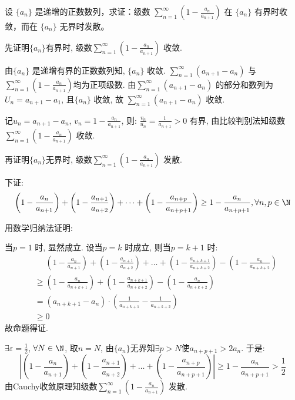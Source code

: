 \setcounter{problems}{4}
\begin{problem}
    设 \(\{a_n\}\) 是递增的正数数列，求证：级数 \(\sum_{n=1}^{\infty} \left(1 -
    \frac{a_n}{a_{n+1}}\right)\) 在 \(\{a_n\}\) 有界时收敛，而在
    \(\{a_n\}\) 无界时发散。
\end{problem}

\begin{solution}
    先证明\(\{a_{n}\}\)有界时,  级数\(\sum_{n=1}^{\infty} \left(1 -
    \frac{a_n}{a_{n+1}}\right)\) 收敛.

    由\(\{a_{n}\}\) 是递增有界的正数数列知, \(\{a_{n}\}\) 收敛.
    \(\sum_{n=1}^{\infty} (a_{n+1} - a_{n})\)
    与\(\sum_{n=1}^{\infty} \left(1 -
    \frac{a_n}{a_{n+1}}\right)\)均为正项级数. 由\(\sum_{n=1}^{\infty}
    (a_{n+1} - a_{n})\) 的部分和数列为\(U_{n} = a_{n+1} - a_{1}\),
    且\(\{a_{n}\}\) 收敛, 故 \(\sum_{n=1}^{\infty} (a_{n+1} - a_{n})\) 收敛.

    记\(u_{n} = a_{n+1} - a_{n}\), \(v_{n} = 1 -
    \frac{a_{n}}{a_{n+1}}\), 则: \(\frac{v_{n}}{u_{n}} =
    \frac{1}{a_{n+1}} > 0\) 有界,
    由比较判别法知级数\(\sum_{n=1}^{\infty} \left(1 -
    \frac{a_n}{a_{n+1}}\right)\) 收敛.

    再证明\(\{a_{n}\}\)无界时, 级数\(\sum_{n=1}^{\infty} \left(1 -
    \frac{a_n}{a_{n+1}}\right)\) 发散.

    下证: \[
        \left(1 - \frac{a_{n}}{a_{n+1}}\right) + \left(1 -
        \frac{a_{n+1}}{a_{n+2}}\right) + \dots +
        \left(1 - \frac{a_{n+p}}{a_{n+p+1}}\right) \geq 1 -
        \frac{a_{n}}{a_{n+p+1}}, \forall n, p \in \N
    \]

    用数学归纳法证明:

    当\(p = 1\) 时, 显然成立.
    设当\(p = k\) 时成立, 则当\(p = k+1\) 时:
    \begin{align*}
        &\mathrel{\phantom{=}} \left(1 - \frac{a_{n}}{a_{n+1}}\right)
        + \left(1 - \frac{a_{n+1}}{a_{n+2}}\right) + \dots + \left(1 -
        \frac{a_{n+k+1}}{a_{n+k+2}}\right) - \left(1 -
        \frac{a_{n}}{a_{n+k+2}}\right)\\
        & \geq \left(1 - \frac{a_{n}}{a_{n+k+1}}\right) + \left(1 -
        \frac{a_{n+k+1}}{a_{n+k+2}}\right) - \left(1 -
        \frac{a_{n}}{a_{n+k+2}}\right)\\
        &= \left(a_{n+k+1} - a_{n}\right) \cdot \left(
            \frac{1}{a_{n+k+1}} -
        \frac{1}{a_{n+k+2}} \right)\\
        & \geq 0
    \end{align*}
    故命题得证.

    \(\exists \varepsilon = \frac{1}{2}\), \(\forall N \in
    \N\), 取\(n = N\), 由\(\{a_{n}\}\)无界知\(\exists p >
    N\)使\(a_{n+p+1} > 2a_{n}\). 于是:
    \[
        \left| \left( 1 - \frac{a_{n}}{a_{n+1}} \right) + \left( 1 -
        \frac{a_{n+1}}{a_{n+2}} \right) + \dots + \left( 1 -
        \frac{a_{n+p}}{a_{n+p+1}} \right)  \right| \geq 1 -
        \frac{a_{n}}{a_{n+p+1}} > \frac{1}{2}
    \]
    由Cauchy收敛原理知级数\(\sum_{n=1}^{\infty} \left(1 -
    \frac{a_n}{a_{n+1}}\right)\) 发散.
\end{solution}

